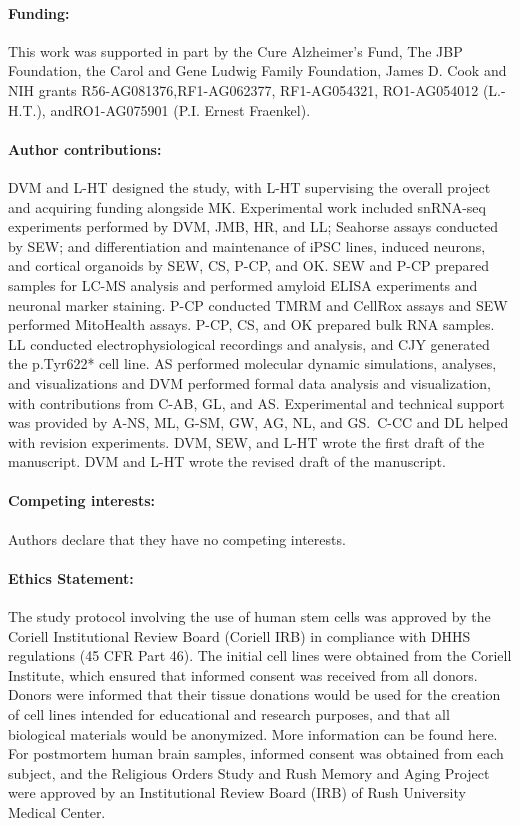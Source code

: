 \documentclass[12pt]{article}
\begin{document}
\paragraph{Funding:} This work was supported in part by the Cure Alzheimer’s Fund, The JBP Foundation, the Carol and Gene Ludwig Family Foundation, James D. Cook and NIH grants R56-AG081376,RF1-AG062377, RF1-AG054321, RO1-AG054012 (L.-H.T.), andRO1-AG075901 (P.I. Ernest Fraenkel).

\paragraph{Author contributions:} DVM and L-HT designed the study, with L-HT supervising the overall project and acquiring funding alongside MK. Experimental work included snRNA-seq experiments performed by DVM, JMB, HR, and LL; Seahorse assays conducted by SEW; and differentiation and maintenance of iPSC lines, induced neurons, and cortical organoids by SEW, CS, P-CP, and OK. SEW and P-CP prepared samples for LC-MS analysis and performed amyloid ELISA experiments and neuronal marker staining. P-CP conducted TMRM and CellRox assays and SEW performed MitoHealth assays. P-CP, CS, and OK prepared bulk RNA samples. LL conducted electrophysiological recordings and analysis, and CJY generated the p.Tyr622* cell line. AS performed molecular dynamic simulations, analyses, and visualizations and DVM performed formal data analysis and visualization, with contributions from C-AB, GL, and AS. Experimental and technical support was provided by A-NS, ML, G-SM, GW, AG, NL, and GS. C-CC and DL helped with revision experiments. DVM, SEW, and L-HT wrote the first draft of the manuscript. DVM and L-HT wrote the revised draft of the manuscript.





\paragraph{Competing interests:} Authors declare that they have no competing interests.


\paragraph{Ethics Statement:} The study protocol involving the use of human stem cells was approved by the Coriell Institutional Review Board (Coriell IRB) in compliance with DHHS regulations (45 CFR Part 46). The initial cell lines were obtained from the Coriell Institute, which ensured that informed consent was received from all donors. Donors were informed that their tissue donations would be used for the creation of cell lines intended for educational and research purposes, and that all biological materials would be anonymized. More information can be found here. For postmortem human brain samples, informed consent was obtained from each subject, and the Religious Orders Study and Rush Memory and Aging Project were approved by an Institutional Review Board (IRB) of Rush University Medical Center.
\end{document}
